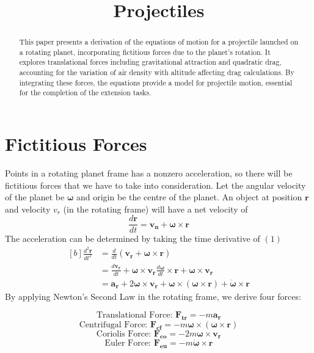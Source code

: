 \documentclass[12pt]{article}
\title{Projectiles}
\newcommand{\bs}[1]{\boldsymbol{#1}}
\newcommand{\om}{\omega}
\begin{document}
\maketitle
\begin{abstract}
This paper presents a derivation of the equations of motion for a projectile launched on a rotating planet, incorporating fictitious forces due to the planet's rotation. It explores translational forces including gravitational attraction and quadratic drag, accounting for the variation of air density with altitude affecting drag calculations. By integrating these forces, the equations provide a model for projectile motion, essential for the completion of the extension tasks.
\end{abstract}
\section{Fictitious Forces}
Points in a rotating planet frame has a nonzero acceleration, so there will be fictitious forces that we have to take into consideration. Let the angular velocity of the planet be $\bs{\om}$ and origin be the centre of the planet. An object at position $\bs{r}$ and velocity $v_r$ (in the rotating frame) will have a net velocity of 
\begin{equation} \frac{d\bs{r}}{dt} = \bs{v_n} + \bs{\om} \times \bs{r} \end{equation}
The acceleration can be determined by taking the time derivative of $(1)$
\begin{equation} 
\begin{aligned}[b]
\frac{d^2\bs{r}}{dt^2} &= \frac{d}{dt}(\bs{v_r} + \bs{\om} \times \bs{r})\\
& = \frac{d\bs{v_r}}{dt} + \bs{\om} \times \bs{v_r} \frac{d\bs{\om}}{dt} \times \bs{r} + \bs{\om} \times \bs{v_r}\\
& = \bs{a_r} +  2\bs{\om} \times \bs{v_r} + \bs{\om} \times (\bs{\om} \times \bs{r}) + \dot{\bs{\om}} \times \bs{r}
\end{aligned}
\end{equation}
By applying Newton's Second Law in the rotating frame, we derive four forces:
\begin{center}
\begin{equation}\text{Translational Force: } \bs{F_{tr}} = -m\bs{a_r}\end{equation}
\begin{equation}\text{Centrifugal Force: } \bs{F_{cf}} = -m\bs{\om} \times (\bs{\om} \times \bs{r})\end{equation}
\begin{equation}\text{Coriolis Force: } \bs{F_{co}} = -2m\bs{\om} \times \bs{v_r}\end{equation}
\begin{equation}\text{Euler Force: } \bs{F_{eu}} = -m\dot{\bs{\om}} \times \bs{r}\end{equation}
\end{center}
\end{document}
